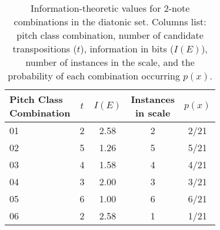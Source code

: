 \begin{table}[htbp]
\centering
\caption{Information-theoretic values for 2-note combinations in the diatonic set.
Columns list: pitch class combination, number of candidate transpositions ($t$),
information in bits ($I(E)$), number of instances in the scale, and the probability
of each combination occurring $p(x)$.}
\label{tab:diatonic-2note}
    \begin{tabular}{l c c c c}
    \toprule
    \makecell[l]{Pitch Class\\Combination} & $t$ & $I(E)$ &
    \makecell[c]{Instances\\in scale} & $p(x)$ \\
    \midrule
    01 & 2 & 2.58 & 2 & 2/21 \\
    02 & 5 & 1.26 & 5 & 5/21 \\
    03 & 4 & 1.58 & 4 & 4/21 \\
    04 & 3 & 2.00 & 3 & 3/21 \\
    05 & 6 & 1.00 & 6 & 6/21 \\
    06 & 2 & 2.58 & 1 & 1/21 \\
    \bottomrule
    \end{tabular}
\end{table}